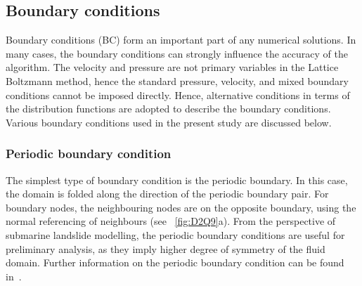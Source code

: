 \subsection{Boundary conditions}
Boundary conditions (BC) form an important part of any numerical solutions. In many cases, the boundary conditions can strongly influence the accuracy of the algorithm. The velocity and pressure are not primary variables in the Lattice Boltzmann method, hence the standard pressure, velocity, and mixed boundary conditions cannot be imposed directly. Hence, alternative conditions in terms of the distribution functions are adopted to describe the boundary conditions. Various boundary conditions used in the present study are discussed below.
\subsubsection*{Periodic boundary condition}
The simplest type of boundary condition is the periodic boundary. In this case, the domain is folded along the direction of the periodic boundary pair. For boundary nodes, the neighbouring nodes are on the opposite boundary, using the normal referencing of neighbours (see ~\cref{fig:D2Q9}a). From the perspective of submarine landslide modelling, the periodic boundary conditions are useful for preliminary analysis, as they imply higher degree of symmetry of the fluid domain. Further information on the periodic boundary condition can be found in~\citet{Aidun1998}.
